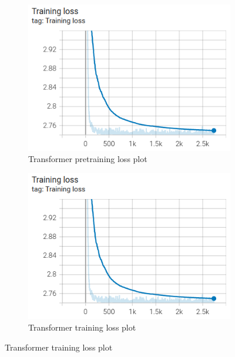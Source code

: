 \begin{figure}[ht]
	\centering
	\begin{subfigure}[b]{0.49\textwidth}
		\centering
		\includegraphics[width=\linewidth]{figures/pretrainingLossPlot.png}
		\caption{Transformer pretraining loss plot}
		\label{pretrainingLossPlot}
	\end{subfigure}
	\hfill
	\begin{subfigure}[b]{0.49\textwidth}
		\centering
		\includegraphics[width=\linewidth]{figures/pretrainingLossPlot.png}
		\caption{Transformer training loss plot}
		\label{trainingLossPlot}
	\end{subfigure}
\end{figure}

